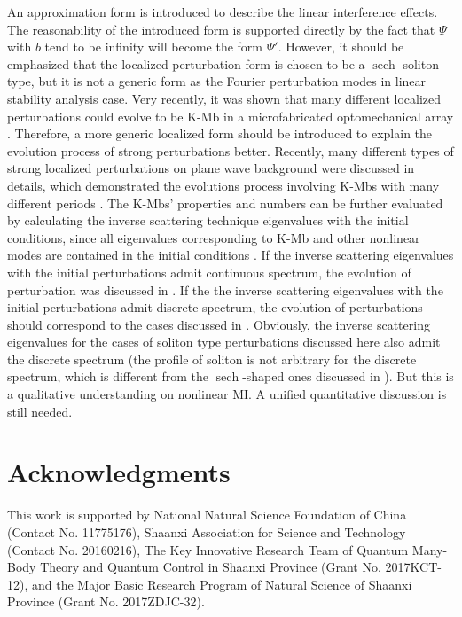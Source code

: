 \documentclass[aps,twocolumn,showpacs]{revtex4}
\DeclareMathOperator{\sech}{sech}
\begin{document}
An approximation form is introduced to describe the linear interference effects. The reasonability of the introduced form is  supported directly by the fact that $\Psi$ with $b$ tend to be infinity will become the form $\Psi'$.  However, it should be emphasized that the localized perturbation form is chosen to be a  $\sech$ soliton type, but it is not a generic form as the Fourier perturbation modes in linear stability analysis case.  Very recently, it was shown that many different localized perturbations could evolve to be K-Mb in a microfabricated optomechanical array \cite{Xiong}. Therefore, a more generic localized form should be introduced to explain the evolution process of strong perturbations better. Recently, many different types of strong localized perturbations on plane wave background were discussed in details, which demonstrated the evolutions process involving K-Mbs with many different periods \cite{NMI,biondini3,Biondini}.  The K-Mbs' properties and numbers can be further evaluated by calculating the inverse scattering technique eigenvalues with the initial conditions, since all eigenvalues corresponding to K-Mb and other nonlinear modes are contained in the initial conditions \cite{NA,NA2}. If  the inverse scattering eigenvalues with the initial perturbations admit continuous spectrum, the evolution of perturbation was discussed in   \cite{NMI}. If the the inverse scattering eigenvalues with the initial perturbations admit discrete  spectrum, the evolution of perturbations should correspond to the cases discussed in \cite{Zakharov,Liu}. Obviously, the inverse scattering eigenvalues for  the cases of soliton type perturbations discussed here also admit the discrete spectrum (the profile of soliton is not arbitrary for the discrete spectrum, which is different from the $\sech$-shaped ones discussed in \cite{Biondini}). But this is a qualitative understanding on nonlinear MI. A unified quantitative discussion is still needed.


\section*{Acknowledgments}
This work is supported by National Natural Science Foundation of
China (Contact No. 11775176), Shaanxi Association for Science and Technology (Contact No. 20160216),  The Key Innovative Research Team of Quantum Many-Body Theory and Quantum Control in Shaanxi Province (Grant No. 2017KCT-12), and the Major Basic Research Program of Natural Science of Shaanxi Province (Grant No. 2017ZDJC-32).
\end{document}
